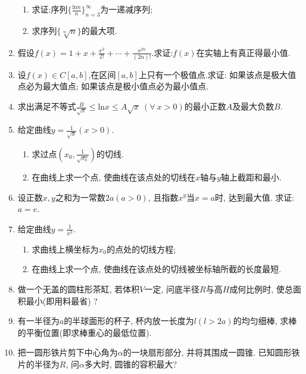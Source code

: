 \begin{enumerate}
\begin{enumerate}
	\item 求证:序列$\{\frac{\mathrm{ln}n}{n}\}_{n=3}^{\infty}$为一递减序列;
	\item 求序列$\{\sqrt[n]{n}\}$的最大项.
\end{enumerate}
	\item 假设$f(x)=1+x+\frac{x^2}{2!}+\cdots+\frac{x^{2n}}{(2n)!}$.求证:$f(x)$在实轴上有真正得最小值.
	\item 设$f(x)\in C[a,b]$,在区间$[a,b]$上只有一个极值点.求证: 如果该点是极大值点必为最大值点; 如果该点是极小值点必为最小值点.
	\item 求出满足不等式$\frac{B}{\sqrt{x}}\le \mathrm{ln}x \le A\sqrt{x}\ (\forall\ x>0)$的最小正数$A$及最大负数$B$.
	\item 给定曲线$y=\frac{1}{\sqrt{x}}(x>0)$.
	\begin{enumerate}
		\item 求过点$(x_0,\frac{1}{\sqrt{x_0}})$的切线.
		\item 在曲线上求一个点, 使曲线在该点处的切线在$x$轴与$y$轴上截距和最小.
	\end{enumerate}
	\item 设正数$x,y$之和为一常数$2a(a>0)$, 且指数$x^y$当$x=a$时, 达到最大值. 求证: $a=e$.
	\item 给定曲线$y=\frac{1}{x^2}$.
	\begin{enumerate}
		\item 求曲线上横坐标为$x_0$的点处的切线方程;
		\item 在曲线上求一个点, 使曲线在该点处的切线被坐标轴所截的长度最短.
	\end{enumerate}
	\item 做一个无盖的圆柱形茶缸, 若体积$V$一定, 问底半径$R$与高$H$成何比例时, 使总面积最小(即用料最省) ?
	\item 有一半径为$a$的半球面形的杯子, 杯内放一长度为$l(l>2a)$的均匀细棒, 求棒的平衡位置(即求棒重心的最低位置).
	\item 把一圆形铁片剪下中心角为$\alpha$的一块扇形部分, 并将其围成一圆锥. 已知圆形铁片的半径为$R$, 问$\alpha$多大时, 圆锥的容积最大?
\end{enumerate}


